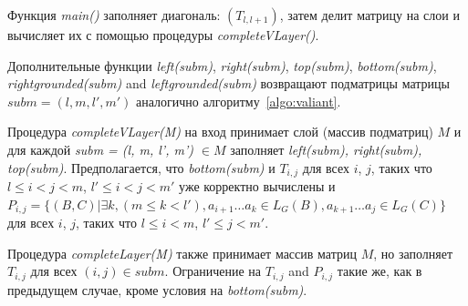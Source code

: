 \documentclass[14pt]{matmex-diploma-custom}
\begin{document}
Функция \textit{main()} заполняет диагональ:  $(T_{l, l+1})$, затем делит матрицу на слои и вычисляет их с помощью процедуры \textit{completeVLayer()}.

Дополнительные функции \textit{left(subm)}, \textit{right(subm)}, \textit{top(subm)}, \textit{bottom(subm)}, \textit{rightgrounded(subm)} and \textit{leftgrounded(subm)} возвращают подматрицы матрицы $\textit{subm} = (l, m, l', m')$ аналогично алгоритму~\ref{algo:valiant}.

Процедура \textit{completeVLayer(M)} на вход принимает слой (массив подматриц)  $M$ и для каждой \textit{subm = (l, m, l', m') $\in M$} заполняет \textit{left(subm), right(subm), top(subm)}.
Предполагается, что \textit{bottom(subm)} и $T_{i, j}$ для всех $i$, $j$, таких что $l \leq i < j < m$, $  l' \leq i < j < m'$ уже корректно вычислены и 
$P_{i, j} =  \{ (B, C) | \exists k, (m \le k < l'), a_{i + 1} \dots a_{k} \in L_G(B), a_{k + 1} \dots a_{j} \in L_G(C)\} $ для всех $i$, $j$, таких что $l \leq i < m$, $l' \leq j < m'$.

Процедура \textit{completeLayer(M)} также принимает массив матриц $M$, но заполняет $T_{i, j}$ для всех $(i, j) \in subm$.
Ограничение на $T_{i, j}$  and $P_{i, j}$ такие же, как в предыдущем случае, кроме условия на \textit{bottom(subm)}.
\end{document}
